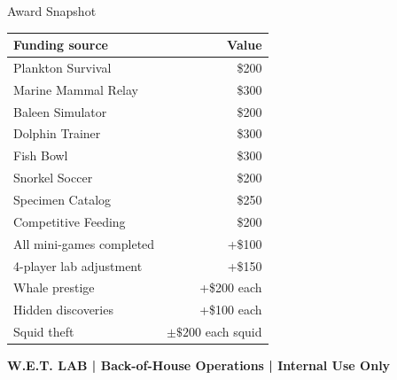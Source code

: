 \documentclass[12pt]{extarticle}
\begin{document}
\begin{minipage}[t]{0.505\textwidth}
\begin{labbox}{Award Snapshot}
\scriptsize
\begin{tabularx}{\linewidth}{@{}Y R@{}}
\toprule
\textbf{Funding source} & \textbf{Value} \\
\midrule
Plankton Survival & \$200 \\
Marine Mammal Relay & \$300 \\
Baleen Simulator & \$200 \\
Dolphin Trainer & \$300 \\
Fish Bowl & \$300 \\
Snorkel Soccer & \$200 \\
Specimen Catalog & \$250 \\
Competitive Feeding & \$200 \\
All mini-games completed & +\$100 \\
4-player lab adjustment & +\$150 \\
Whale prestige & +\$200 each \\
Hidden discoveries & +\$100 each \\
Squid theft & \(\pm\$200\) each squid \\
\bottomrule
\end{tabularx}
\end{labbox}
\end{minipage}

\vfill
\begin{center}
\footnotesize\color{agencyblue}\textbf{W.E.T. LAB | Back-of-House Operations | Internal Use Only}
\end{center}
\end{document}
